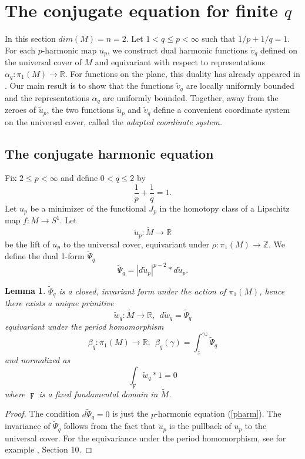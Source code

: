 \documentclass{ip-journal}
\newtheorem{lemma}[theorem]{Lemma}
\theoremstyle{definition}
\numberwithin{equation}{section}
\newcommand{\R}{\mathbb R}
\newcommand{\Z}{\mathbb Z}
\begin{document}
\section{The conjugate equation for finite $q$}\label{sect:conjug}
In this section $dim (M)=n=2$. Let $1<q \leq p< \infty$ such that $1/p + 1/q = 1$.
 For each $p$-harmonic map $u_p$, we construct  dual harmonic functions $\tilde v_q$ defined on the universal cover of $M$ and equivariant with respect to representations $\alpha_q: \pi_1(M) \rightarrow \R$. For functions on the plane, this duality has already appeared in  \cite{aronsonlin}. Our main result  is to show that the functions $\tilde v_q$ are locally uniformly  bounded and the representations $\alpha_q$ are uniformly bounded. Together, away from the zeroes of $\tilde u_p$,  the two functions $\tilde u_p$ and $\tilde v_q$ define a convenient coordinate system on the universal cover, called the {\it{adapted coordinate system.}}
\subsection{The conjugate harmonic equation}
Fix $2\leq p < \infty$ and define $0< q \leq 2$ by
\begin{equation}\label{form:conjugate}
\frac{1}{p}+\frac{1}{q}=1.
\end{equation}
Let $u_p$ be a minimizer of the functional 
$J_p$ in the homotopy class of a Lipschitz map $f: M \rightarrow S^1$.
Let 
\[
\tilde u_p: \tilde M \rightarrow \R
\]
be the lift of $u_p$ to the universal cover, equivariant under 
$\rho: \pi_1(M) \rightarrow \Z$. We define the dual 1-form $ \tilde \Psi_q$
\begin{equation}\label{dualform}
\tilde \Psi_q=|d \tilde u_p|^{p-2}*d\tilde u_p.
\end{equation}
\begin{lemma}  $ \tilde \Psi_q$ is a closed, invariant form under the action of $\pi_1(M)$, hence there exists a unique primitive
\[
\tilde w_q: \tilde M \rightarrow \R, \ \ d\tilde w_q= \tilde \Psi_q
\]
equivariant under the period homomorphism
\[
 \beta_q: \pi_1(M) \rightarrow \R; \ \ \beta_q(\gamma)=\int_z^{\gamma z} \tilde \Psi_q
\]
and normalized as
\[
\int_\digamma \tilde w_q *1=0
\]
where $\digamma$ is a fixed fundamental  domain in $\tilde M$.
\end{lemma} 
\begin{proof} The condition $d \tilde \Psi_q=0$ is just the $p$-harmonic equation (\ref{pharm}). The invariance of $\tilde \Psi_q$ follows from the fact that 
$\tilde u_p$ is the pullback of $ u_p$ to the universal cover. For the equivariance under the period homomorphism, see for example \cite{foster}, Section 10.
\end{proof}
\end{document}

